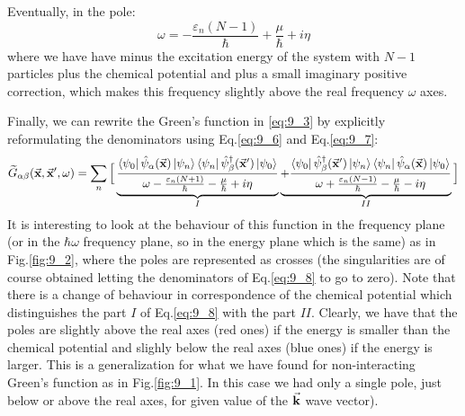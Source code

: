 \documentclass[../main/main.tex]{subfiles}
\begin{document}
Eventually, in the pole:
\begin{equation}
  \omega = - \frac{\varepsilon _n (N-1)}{\hbar } + \frac{\mu }{\hbar } + i \eta
  \label{eq:9_7}
\end{equation}
where we have have minus the excitation energy of the system with \( N-1 \) particles plus the chemical potential and plus a small imaginary positive correction, which makes this frequency slightly above the real frequency  \( \omega  \) axes.


Finally, we can rewrite the Green's function in \eqref{eq:9_3} by explicitly reformulating the denominators using Eq.\eqref{eq:9_6} and Eq.\eqref{eq:9_7}:
\begin{equation}
\begin{split}
\widetilde{G}_{\alpha \beta } (\va{x},\va{x}', \omega )   &=
\sum_{n}^{} \Big[
\underbrace{
\frac{\bra{\psi _0} \hat{\psi }_ \alpha
 (\va{x}) \ket{\psi _n} \bra{\psi _n} \hat{\psi }_ \beta ^\dag (\va{x}') \ket{\psi _0}  }{\omega - \frac{\varepsilon _n (N+1)}{\hbar } - \frac{\mu }{\hbar } + i \eta }
 }_{I}
\underbrace{
+   \frac{\bra{\psi _0} \hat{\psi }_ \beta ^\dag (\va{x}') \ket{\psi _n} \bra{\psi _n}  \hat{\psi }_ \alpha
 (\va{x})  \ket{\psi _0}  }{  \omega + \frac{\varepsilon _n (N-1)}{\hbar } - \frac{\mu }{\hbar } - i \eta }
}_{II}
 \Big] \\
\end{split}
\label{eq:9_8}
\end{equation}
It is interesting to look at the behaviour of this function in the frequency plane (or in the \( \hbar \omega  \) frequency plane, so in the energy plane which is the same) as in Fig.\ref{fig:9_2}, where the poles are represented as crosses (the singularities are of course obtained letting the denominators of Eq.\eqref{eq:9_8} to go to zero). Note that there is a change of behaviour in correspondence of the chemical potential which distinguishes the part \( I \) of Eq.\eqref{eq:9_8} with the part \( II \). Clearly, we have that the poles are slightly above the real axes (red ones) if the energy is smaller than the chemical potential and slighly below the real axes (blue ones) if the energy is larger. This is a generalization for what we have found for non-interacting Green's function as in Fig.\ref{fig:9_1}. In this case we had only a single pole, just below or above the real axes, for given value of the \( \va{k} \) wave vector).
\end{document}
